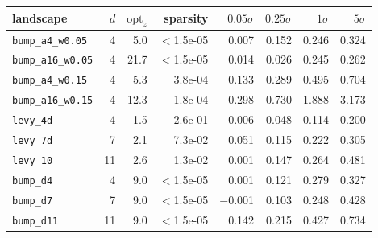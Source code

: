 \begin{tabular}{lrrrrrrr}
\toprule
landscape & $d$ & $\mathrm{opt}_z$ & sparsity & $0.05\sigma$ & $0.25\sigma$ & $1\sigma$ & $5\sigma$ \\
\midrule
\texttt{bump\_a4\_w0.05} & 4 & 5.0 & $<$1.5e-05 & 0.007 & 0.152 & 0.246 & 0.324 \\
\texttt{bump\_a16\_w0.05} & 4 & 21.7 & $<$1.5e-05 & 0.014 & 0.026 & 0.245 & 0.262 \\
\addlinespace
\texttt{bump\_a4\_w0.15} & 4 & 5.3 & 3.8e-04 & 0.133 & 0.289 & 0.495 & 0.704 \\
\texttt{bump\_a16\_w0.15} & 4 & 12.3 & 1.8e-04 & 0.298 & 0.730 & 1.888 & 3.173 \\
\midrule
\texttt{levy\_4d} & 4 & 1.5 & 2.6e-01 & 0.006 & 0.048 & 0.114 & 0.200 \\
\texttt{levy\_7d} & 7 & 2.1 & 7.3e-02 & 0.051 & 0.115 & 0.222 & 0.305 \\
\texttt{levy\_10} & 11 & 2.6 & 1.3e-02 & 0.001 & 0.147 & 0.264 & 0.481 \\
\midrule
\texttt{bump\_d4} & 4 & 9.0 & $<$1.5e-05 & 0.001 & 0.121 & 0.279 & 0.327 \\
\texttt{bump\_d7} & 7 & 9.0 & $<$1.5e-05 & $-$0.001 & 0.103 & 0.248 & 0.428 \\
\texttt{bump\_d11} & 11 & 9.0 & $<$1.5e-05 & 0.142 & 0.215 & 0.427 & 0.734 \\
\bottomrule
\end{tabular}

